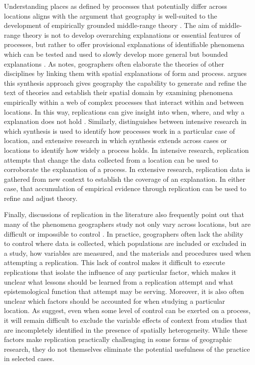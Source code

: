 \documentclass[]{interact}
\theoremstyle{plain}%
\theoremstyle{definition}
\theoremstyle{remark}
\begin{document}
Understanding places as defined by processes that potentially differ across locations aligns with the argument that geography is well-suited to the development of empirically grounded middle-range theory \citep{miller2015data}.
The aim of middle-range theory is not to develop overarching explanations or essential features of processes, but rather to offer provisional explanations of identifiable phenomena which can be tested and used to slowly develop more general but bounded explanations \citep{merton1968social}.
As \cite{harvey1969} notes, geographers often elaborate the theories of other disciplines by linking them with spatial explanations of form and process.
\cite{turner1989, turner2002} argues this synthesis approach gives geography the capability to generate and refine the text of theories and establish their spatial domain by examining phenomena empirically within a web of complex processes that interact within and between locations. 
In this way, replications can give insight into when, where, and why a explanation does not hold \citep{zhang_wolf_2023}.
Similarly, \cite{sayer1992method} distinguishes between intensive research in which synthesis is used to identify how processes work in a particular case of location, and extensive research in which synthesis extends across cases or locations to identify how widely a process holds. 
In intensive research, replication attempts that change the data collected from a location can be used to corroborate the explanation of a process.
In extensive research, replication data is gathered from new context to establish the coverage of an explanation. 
In either case, that accumulation of empirical evidence through replication can be used to refine and adjust theory.

Finally, discussions of replication in the literature also frequently point out that many of the phenomena geographers study not only vary across locations, but are difficult or impossible to control \citep[see][]{sayer1992method, kedron2021GA, waters2021motivations}. 
In practice, geographers often lack the ability to control where data is collected, which populations are included or excluded in a study, how variables are measured, and the materials and procedures used when attempting a replication.
This lack of control makes it difficult to execute replications that isolate the influence of any particular factor, which makes it unclear what lessons should be learned from a replication attempt and what epistemological function that attempt may be serving. 
Moreover, it is also often unclear which factors should be accounted for when studying a particular location.
As \cite{goodchild2021replication} suggest, even when some level of control can be exerted on a process, it will remain difficult to exclude the variable effects of context from studies that are incompletely identified in the presence of spatially heterogeneity.
While these factors make replication practically challenging in some forms of geographic research, they do not themselves eliminate the potential usefulness of the practice in selected cases. 
\end{document}
